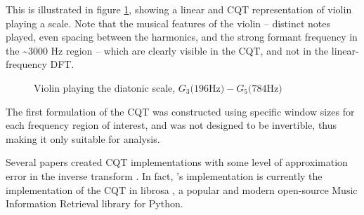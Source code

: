 \documentclass[letter,12pt,notitlepage]{article}
\begin{document}
This is illustrated in figure \ref{fig:violin}, showing a linear and CQT representation of violin playing a scale. Note that the musical features of the violin -- distinct notes played, even spacing between the harmonics, and the strong formant frequency in the \textasciitilde3000 Hz region -- which are clearly visible in the CQT, and not in the linear-frequency DFT.

\begin{figure}[ht]
	\centering
	\hspace{0.5em}
	\caption{Violin playing the diatonic scale, $G_{3} \text{(196Hz)} - G_{5} \text{(784Hz)}$}
	\label{fig:violin}
\end{figure}



The first formulation of the CQT was constructed using specific window sizes for each frequency region of interest, and was not designed to be invertible, thus making it only suitable for analysis.

Several papers created CQT implementations with some level of approximation error in the inverse transform \cite{klapuricqt, fitzgeraldcqt}. In fact, \citet{klapuricqt}'s implementation is currently the implementation of the CQT in librosa \cite{librosa}, a popular and modern open-source Music Information Retrieval library for Python.
\end{document}
